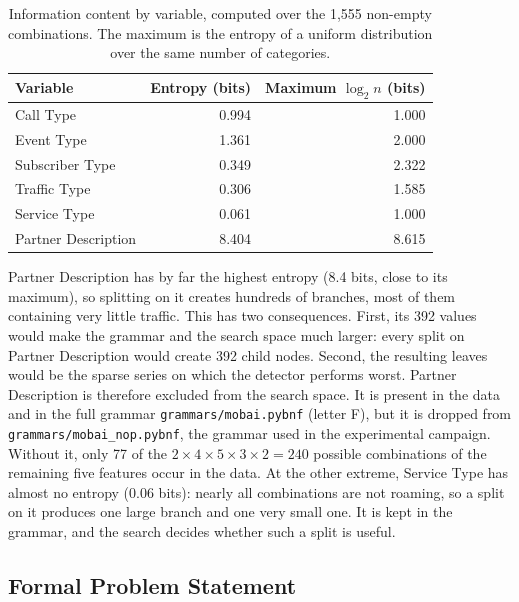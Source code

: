\begin{table}[H]
    \centering
    \caption[Information content by variable]{Information content by variable, computed over the 1,555 non-empty combinations. The maximum is the entropy of a uniform distribution over the same number of categories.}
    \label{tab:entropy}
    \begin{tabular}{lrr}
        \toprule
        Variable & Entropy (bits) & Maximum $\log_2 n$ (bits) \\
        \midrule
        Call Type & 0.994 & 1.000 \\
        Event Type & 1.361 & 2.000 \\
        Subscriber Type & 0.349 & 2.322 \\
        Traffic Type & 0.306 & 1.585 \\
        Service Type & 0.061 & 1.000 \\
        Partner Description & 8.404 & 8.615 \\
        \bottomrule
    \end{tabular}
\end{table}

Partner Description has by far the highest entropy (8.4 bits, close to its maximum), so splitting on it creates hundreds of branches, most of them containing very little traffic.
This has two consequences.
First, its 392 values would make the grammar and the search space much larger: every split on Partner Description would create 392 child nodes.
Second, the resulting leaves would be the sparse series on which the detector performs worst.
Partner Description is therefore excluded from the search space.
It is present in the data and in the full grammar \texttt{grammars/mobai.pybnf} (letter F), but it is dropped from \texttt{grammars/mobai\_nop.pybnf}, the grammar used in the experimental campaign.
Without it, only 77 of the $2 \times 4 \times 5 \times 3 \times 2 = 240$ possible combinations of the remaining five features occur in the data.
At the other extreme, Service Type has almost no entropy (0.06 bits): nearly all combinations are not roaming, so a split on it produces one large branch and one very small one.
It is kept in the grammar, and the search decides whether such a split is useful.

\subsection{Formal Problem Statement}
\label{sec:problem-statement}

